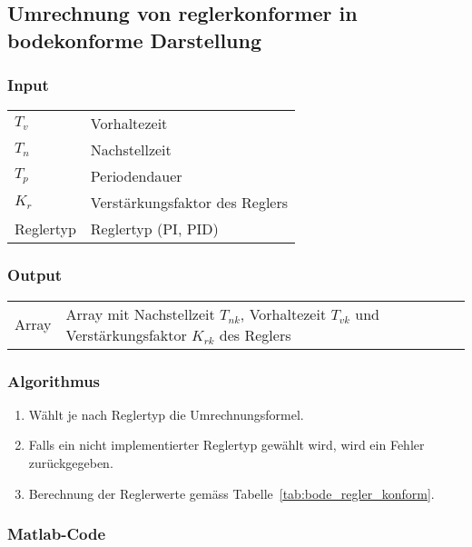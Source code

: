 \clearpage
\subsection{Umrechnung von reglerkonformer in bodekonforme Darstellung}
\label{app:algo:regbode}

\subsubsection*{Input}
\begin{tabular}{p{40mm}l}
    $ T_v $        & Vorhaltezeit \\
    $ T_n $        & Nachstellzeit \\
    $ T_p $        & Periodendauer \\
    $ K_r $        & Verst\"arkungsfaktor des Reglers \\
    Reglertyp      & Reglertyp (PI, PID)
\end{tabular}

\subsubsection*{Output}
\begin{tabular}{p{40mm}l}
    Array & \parbox[t][4em][s]{0.7\textwidth}{Array mit Nachstellzeit $ T_{nk} $, Vorhaltezeit $ T_{vk} $ und Verst\"arkungsfaktor $ K_{rk} $ des Reglers}
\end{tabular}

\subsubsection*{Algorithmus}
\begin{enumerate}
    \item
        W\"ahlt je nach Reglertyp die Umrechnungsformel.
    \item
        Falls  ein nicht  implementierter Reglertyp  gew\"ahlt wird,  wird ein
        Fehler zur\"uckgegeben.
    \item
        Berechnung             der            Reglerwerte             gem\"ass
        Tabelle~\ref{tab:bode_regler_konform}.
\end{enumerate}
\subsubsection*{Matlab-Code}



